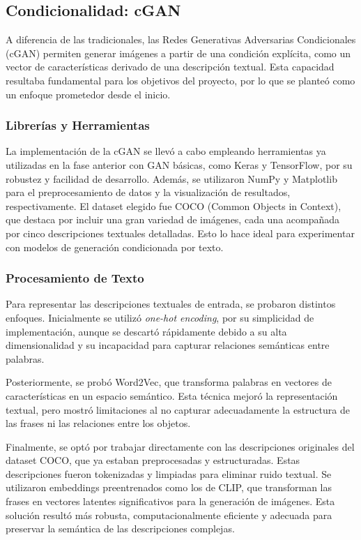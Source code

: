 \subsection{Condicionalidad: cGAN}
A diferencia de las tradicionales, las Redes Generativas Adversarias Condicionales (cGAN) permiten generar imágenes a partir de una condición explícita, como un vector de características derivado de una descripción textual. Esta capacidad resultaba fundamental para los objetivos del proyecto, por lo que se planteó como un enfoque prometedor desde el inicio.

\subsubsection{Librerías y Herramientas}
La implementación de la cGAN se llevó a cabo empleando herramientas ya utilizadas en la fase anterior con GAN básicas, como Keras y TensorFlow, por su robustez y facilidad de desarrollo. Además, se utilizaron NumPy y Matplotlib para el preprocesamiento de datos y la visualización de resultados, respectivamente. El dataset elegido fue COCO (Common Objects in Context), que destaca por incluir una gran variedad de imágenes, cada una acompañada por cinco descripciones textuales detalladas. Esto lo hace ideal para experimentar con modelos de generación condicionada por texto.

\subsubsection{Procesamiento de Texto}
Para representar las descripciones textuales de entrada, se probaron distintos enfoques. Inicialmente se utilizó \textit{one-hot encoding}, por su simplicidad de implementación, aunque se descartó rápidamente debido a su alta dimensionalidad y su incapacidad para capturar relaciones semánticas entre palabras.

Posteriormente, se probó Word2Vec, que transforma palabras en vectores de características en un espacio semántico. Esta técnica mejoró la representación textual, pero mostró limitaciones al no capturar adecuadamente la estructura de las frases ni las relaciones entre los objetos.

Finalmente, se optó por trabajar directamente con las descripciones originales del dataset COCO, que ya estaban preprocesadas y estructuradas. Estas descripciones fueron tokenizadas y limpiadas para eliminar ruido textual. Se utilizaron embeddings preentrenados como los de CLIP, que transforman las frases en vectores latentes significativos para la generación de imágenes. Esta solución resultó más robusta, computacionalmente eficiente y adecuada para preservar la semántica de las descripciones complejas.

